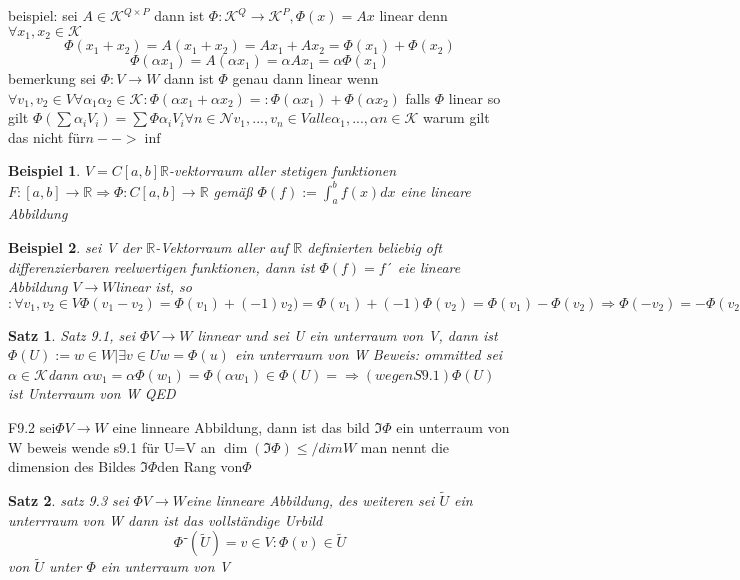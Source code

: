 \documentclass[11pt]{article}
\newtheorem{beispiel}{Beispiel}
\newtheorem{satz}{Satz}
\begin{document}
beispiel: sei $A \in \mathcal{K}^{Q\times P}$ dann ist $\Phi: \mathcal{K}^Q \rightarrow \mathcal{K}^P , \Phi (x)= A x$ linear denn $\forall x_1, x_2 \in \mathcal{K}$
\[
\Phi (x_1+x_2)= A(x_1+x_2)= A x_1+Ax_2= \Phi (x_1)+\Phi (x_2)
\]
\[
\Phi (\alpha x_1)=A(\alpha x_1)=\alpha Ax_1= \alpha \Phi (x_1)
\]bemerkung sei $ \Phi : V \rightarrow W $ dann ist $\Phi$ genau dann linear wenn $\forall v_1, v_2 \in V \forall \alpha_1 \alpha_2  \in \mathcal{K} : \Phi (\alpha x_1+\alpha x_2)=:\Phi (\alpha x_1)+\Phi (\alpha x_2)$
falls $\Phi$ linear so gilt $\Phi (\sum \alpha_iV_i )= \sum \Phi \alpha_iV_i \forall n \in \mathcal{N} v_1,...,v_n \in V alle \alpha_1,...,\alpha n \in \mathcal{K}$
warum gilt das nicht für$ n--> \inf$
\begin{beispiel}
 $V = C [a,b] \mathbb{R}$-vektorraum aller stetigen funktionen  $F:[a,b]  \rightarrow \mathbb{R} \Rightarrow \Phi : C [a,b]  \rightarrow \mathbb{R}$ gemäß $\Phi(f):= \int_{a}^{b}{f(x)dx}$ eine lineare Abbildung
\end{beispiel}
\begin{beispiel}
 sei V der $\mathbb{R}$-Vektorraum aller auf $\mathbb{R}$ definierten beliebig oft differenzierbaren reelwertigen funktionen,
 dann ist $\Phi (f)=f´$ eie lineare Abbildung $V \rightarrow W  $linear    ist, so 
 $:\forall v_1, v_2 \in V  \Phi (v_1-v_2)=\Phi (v_1)+(-1)v_2)= \Phi (v_1)+(-1)\Phi (v_2)=\Phi (v_1)-\Phi (v_2) \Rightarrow \Phi (-v_2)=-\Phi (v_2)$
\end{beispiel}

\begin{satz}
 Satz 9.1, sei $\Phi V \rightarrow W$ linnear und sei U ein unterraum von V, dann ist 
 $\Phi(U):= { w \in W | \exists v \in U w = \Phi (u)} $
 ein unterraum von W
Beweis: ommitted
sei $\alpha \in \mathcal{K}$dann $\alpha w_1  = \alpha\Phi(w_1)= \Phi(\alpha w_1) \in \Phi (U)= \Rightarrow (wegen S9.1) \Phi (U) $ ist Unterraum von W QED
\end{satz}


F9.2 sei$ \Phi V \rightarrow W$ eine  linneare Abbildung, dann ist das bild $\Im \Phi$ ein unterraum von W
beweis wende s9.1 für U=V an 
$\dim (\Im \Phi) \leq /dim W$
man nennt die dimension des Bildes $\Im \Phi $den Rang von$ \Phi $

\begin{satz}
 satz 9.3
sei $\Phi V \rightarrow W $eine  linneare Abbildung, des weiteren sei $\tilde{U}$ ein unterrraum von W dann ist das vollständige Urbild \[\Phi⁻(\tilde{U} ) = {v \in V: \Phi (v) \in \tilde{U} }\]
von $\tilde{U} $ unter $\Phi$ ein unterraum von V
\end{satz}
\end{document}
